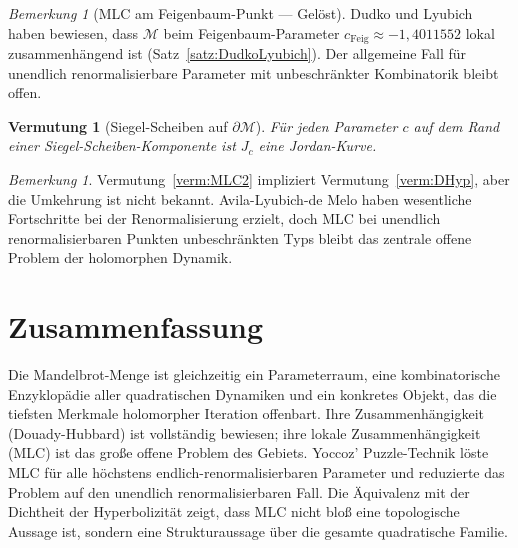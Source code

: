 \documentclass[12pt,a4paper]{amsart}
\newtheorem{vermutung}[theorem]{Vermutung}
\theoremstyle{definition}
\theoremstyle{remark}
\newtheorem{bemerkung}[theorem]{Bemerkung}
\begin{document}
\begin{bemerkung}[MLC am Feigenbaum-Punkt — Gelöst]
Dudko und Lyubich~\cite{DudkoLyubich2023} haben bewiesen, dass
$\mathcal{M}$ beim Feigenbaum-Parameter
$c_{\mathrm{Feig}} \approx -1{,}4011552$ lokal zusammenhängend ist
(Satz~\ref{satz:DudkoLyubich}). Der allgemeine Fall für unendlich
renormalisierbare Parameter mit unbeschränkter Kombinatorik bleibt offen.
\end{bemerkung}

\begin{vermutung}[Siegel-Scheiben auf $\partial\mathcal{M}$]
Für jeden Parameter $c$ auf dem Rand einer Siegel-Scheiben-Komponente
ist $J_c$ eine Jordan-Kurve.
\end{vermutung}

\begin{bemerkung}
Vermutung~\ref{verm:MLC2} impliziert Vermutung~\ref{verm:DHyp}, aber
die Umkehrung ist nicht bekannt. Avila-Lyubich-de Melo haben wesentliche
Fortschritte bei der Renormalisierung erzielt, doch MLC bei unendlich
renormalisierbaren Punkten unbeschränkten Typs bleibt das zentrale
offene Problem der holomorphen Dynamik.
\end{bemerkung}

\section{Zusammenfassung}

Die Mandelbrot-Menge ist gleichzeitig ein Parameterraum, eine kombinatorische
Enzyklopädie aller quadratischen Dynamiken und ein konkretes Objekt, das die
tiefsten Merkmale holomorpher Iteration offenbart. Ihre Zusammenhängigkeit
(Douady-Hubbard) ist vollständig bewiesen; ihre lokale Zusammenhängigkeit
(MLC) ist das große offene Problem des Gebiets. Yoccoz' Puzzle-Technik löste
MLC für alle höchstens endlich-renormalisierbaren Parameter und reduzierte
das Problem auf den unendlich renormalisierbaren Fall. Die Äquivalenz mit der
Dichtheit der Hyperbolizität zeigt, dass MLC nicht bloß eine topologische
Aussage ist, sondern eine Strukturaussage über die gesamte quadratische Familie.
\end{document}
